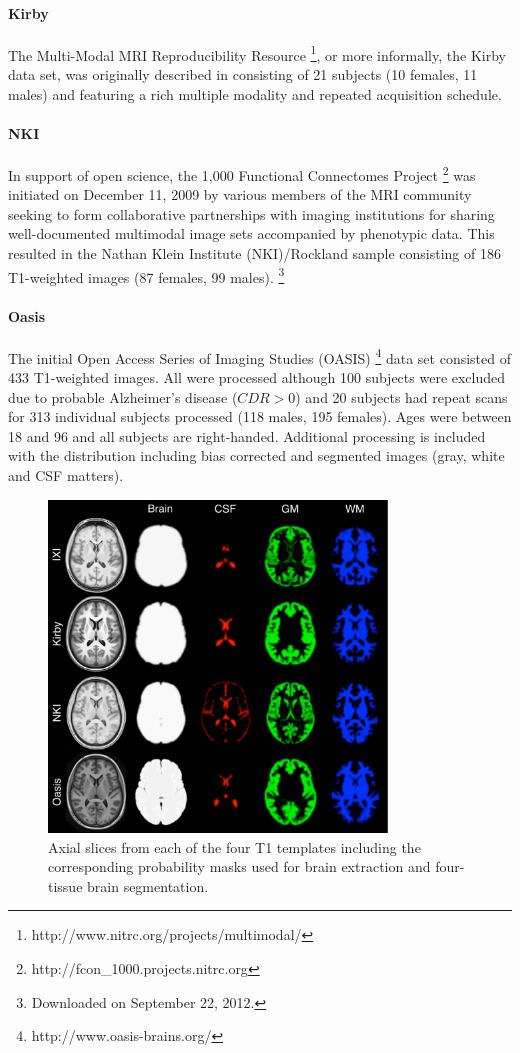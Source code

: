 \paragraph{Kirby}
The Multi-Modal MRI Reproducibility Resource%
\footnote{
http://www.nitrc.org/projects/multimodal/
}, 
or more informally, the Kirby
data set, was originally described in \cite{landman2011} consisting of 
21 subjects (10 females, 11 males) and featuring a rich multiple modality and 
repeated acquisition schedule.

\paragraph{NKI}
In support of open science, the 1,000 Functional Connectomes Project%
\footnote{ 
http://fcon\_1000.projects.nitrc.org
}
was initiated on December 11, 2009 by various members of the MRI community
seeking to form collaborative partnerships with imaging institutions for 
sharing well-documented multimodal image sets accompanied by phenotypic data.
This resulted in the Nathan Klein Institute (NKI)/Rockland sample
consisting of 186 T1-weighted
images (87 females, 99 males).%
\footnote{
Downloaded on September 22, 2012.
}

\paragraph{Oasis}
The initial Open Access Series of Imaging Studies (OASIS)%
\footnote{
http://www.oasis-brains.org/
}
data set consisted of 433 T1-weighted images.  All were processed
although 100 subjects were excluded due to probable Alzheimer's
disease ($CDR > 0$) and 20 subjects had repeat scans
for 313 individual subjects processed (118 males, 195 females).
Ages were between 18 and 96 and  
all subjects are right-handed.  Additional processing is included
with the distribution including bias corrected and segmented images
(gray, white and CSF matters).  


\begin{figure}
  \centering
  \includegraphics[width=90mm]{Figures/templateProbabilityMasks.pdf}
  \caption{Axial slices from each of the four T1 templates including the corresponding
  probability masks used for brain extraction and four-tissue brain segmentation.  
  }
  \label{fig:templateMasks}
\end{figure}



